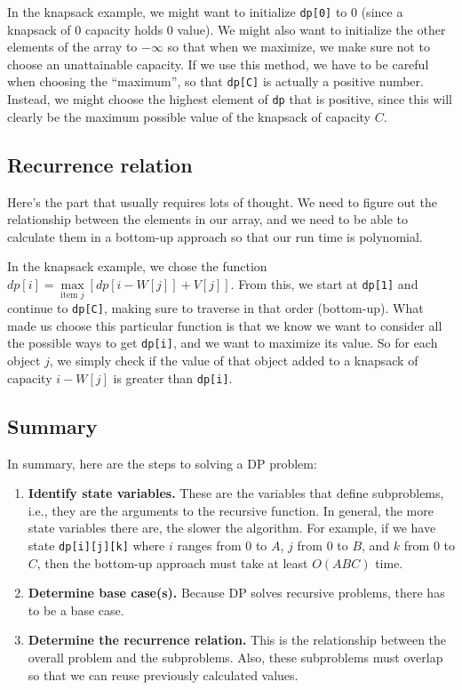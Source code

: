 In the knapsack example, we might want to initialize \verb=dp[0]= to $0$ (since a knapsack of $0$ capacity holds $0$ value).  We might also want to initialize the other elements of the array to $-\infty$ so that when we maximize, we make sure not to choose an unattainable capacity.  If we use this method, we have to be careful when choosing the ``maximum'', so that \verb=dp[C]= is actually a positive number.  Instead, we might choose the highest element of \verb=dp= that is positive, since this will clearly be the maximum possible value of the knapsack of capacity $C$.

\subsection{Recurrence relation}
Here's the part that usually requires lots of thought.  We need to figure out the relationship between the elements in our array, and we need to be able to calculate them in a bottom-up approach so that our run time is polynomial.

In the knapsack example, we chose the function $dp[i] = \max\limits_{\text{item } j} \left[dp[i-W[j]]+V[j]\right]$.  From this, we start at \verb=dp[1]= and continue to \verb=dp[C]=, making sure to traverse in that order (bottom-up).  What made us choose this particular function is that we know we want to consider all the possible ways to get \verb=dp[i]=, and we want to maximize its value.  So for each object $j$, we simply check if the value of that object added to a knapsack of capacity $i-W[j]$ is greater than \verb=dp[i]=.

\subsection{Summary}
In summary, here are the steps to solving a DP problem:

\begin{enumerate}
    \item \textbf{Identify state variables.} These are the variables that define subproblems, i.e., they are the arguments to the recursive function. In general, the more state variables there are, the slower the algorithm. For example, if we have state \texttt{dp[i][j][k]} where $i$ ranges from 0 to $A$, $j$ from 0 to $B$, and $k$ from 0 to $C$, then the bottom-up approach must take at least $O(ABC)$ time.
    \item \textbf{Determine base case(s).} Because DP solves recursive problems, there has to be a base case.
    \item \textbf{Determine the recurrence relation.} This is the relationship between the overall problem and the subproblems. Also, these subproblems must overlap so that we can reuse previously calculated values.
\end{enumerate}